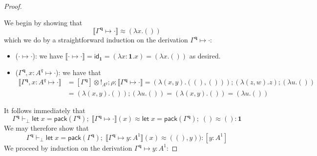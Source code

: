 \documentclass[acmsmall,screen,review]{acmart}
\newcommand{\mb}[1]{\ensuremath{\mathbf{#1}}}
\newcommand{\ms}[1]{\ensuremath{\mathsf{#1}}}
\newcommand{\letexpr}[3]{\ensuremath{\ms{let}\;#1 = #2;\;#3}}
\newcommand{\cwk}[2]{#1 \mapsto #2}
\newcommand{\dnt}[1]{\llbracket{#1}\rrbracket}
\newcommand{\tmor}[1]{{!}_{#1}}
\begin{document}
\begin{proof}
\begin{itemize}
  \end{itemize} 
  We begin by showing that
  \begin{equation*}
    \dnt{\cwk{\Gamma^{\mb{q}}}{\cdot}} \approx (\lambda x. ())
  \end{equation*}
  which we do by a straightforward induction on the derivation $\cwk{\Gamma^{\mb{q}}}{\cdot}$:
  \begin{itemize}
    \item ($\cwk{\cdot}{\cdot}$): we have $\dnt{\cwk{\cdot}{\cdot}} = \ms{id}_{\mb{1}} = (\lambda x
    : \mb{1}.x) = (\lambda x.())$ as desired.
    \item ($\cwk{\Gamma^{\mb{q}}, x : A^q}{\cdot}$): we have that
    \begin{align*}
      \dnt{\cwk{\Gamma^{\mb{q}}, x : A^q}{\cdot}}
      &= [\Gamma^{\mb{q}}] \otimes \tmor{A^q} ; \rho ; \dnt{\cwk{\Gamma^{\mb{q}}}{\cdot}} 
       = (\lambda (x, y) . ((), ())) ; (\lambda (z, w) . z) ; (\lambda u . ()) \\
      &= (\lambda (x, y) . ()) ; (\lambda u . ()) = (\lambda (x, y) . ()) = (\lambda u . ())
    \end{align*}
  \end{itemize}
  It follows immediately that
  \begin{equation*}
  \Gamma^{\mb{q}} \vdash_\bot 
    \letexpr{x}{\ms{pack}(\Gamma^{\mb{q}})}{\dnt{\cwk{\Gamma^{\mb{q}}}{\cdot}}(x)}
    \approx \letexpr{x}{\ms{pack}(\Gamma^{\mb{q}})}{()}
    \approx ()
    : \mb{1}
  \end{equation*}
  We may therefore show that
  \begin{equation*}
  \Gamma^{\mb{q}} \vdash_\bot 
    \letexpr{x}{\ms{pack}(\Gamma^{\mb{q}})}{\dnt{\cwk{\Gamma^{\mb{q}}}{y : A^1}}(x)}
    \approx ((), y))
    : [y : A^1]
  \end{equation*}
  We proceed by induction on the derivation $\cwk{\Gamma^{\mb{q}}}{y : A^1}$:
\end{proof}
\end{document}
